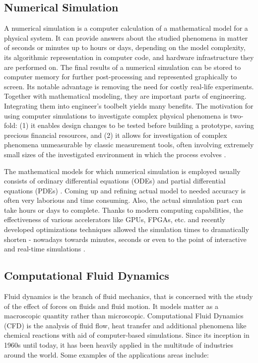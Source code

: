 \subsection{Numerical Simulation}
A numerical simulation is a computer calculation of a mathematical model for a physical system. It can provide answers about the studied phenomena in matter of seconds or minutes up to hours or days, depending on the model complexity, its algorithmic representation in computer code, and hardware infrastructure they are performed on. The final results of a numerical simulation can be stored to computer memory for further post-processing and represented graphically to screen. Its notable advantage is removing the need for costly real-life experiments. Together with mathematical modeling, they are important parts of engineering. Integrating them into engineer's toolbelt yields many benefits. The motivation for using computer simulations to investigate complex physical phenomena is two-fold: (1) it enables design changes to be tested before building a prototype, saving precious financial resources, and (2) it allows for investigation of complex phenomena unmeasurable by classic measurement tools, often involving extremely small sizes of the investigated environment in which the process evolves \citep{rago2015numerical}.

The mathematical models for which numerical simulation is employed usually consists of ordinary differential equations (ODEs) and partial differential equations (PDEs) \citep{yangEngineeringMathematicsExamples2017}. Coming up and refining actual model to needed accuracy is often very laborious and time consuming. Also, the actual simulation part can take hours or days to complete. Thanks to modern computing capabilities, the effectiveness of various accelerators like GPUs, FPGAs, etc. and recently developed optimizations techniques allowed the simulation times to dramatically shorten - nowadays towards minutes, seconds or even to the point of interactive and real-time simulations \citep{harwoodREALTIMEMODELLINGSIMULATION}.

\subsection{Computational Fluid Dynamics}\label{sec:cfd}
Fluid dynamics is the branch of fluid mechanics, that is concerned with the study of the effect of forces on fluids and fluid motion. It models matter as a macroscopic quantity rather than microscopic. Computational Fluid Dynamics (CFD) is the analysis of fluid flow, heat transfer and additional phenomena like chemical reactions with aid of computer-based simulations. Since its inception in 1960s until today, it has been heavily applied in the multitude of industries around the world. Some examples of the applications areas include:

